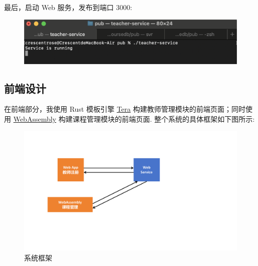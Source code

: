 \documentclass[12pt, oneside]{ctexart}
\numberwithin{figure}{section}
\numberwithin{table}{section}
\begin{document}
最后，启动 Web 服务，发布到端口 3000:
\begin{figure}[!htbp]
    \centering
    \includegraphics[width=13cm]{images/sec5/teacher-service.png}
\end{figure}

\subsection{前端设计}

在前端部分，我使用 Rust 模板引擎 \href{https://keats.github.io/tera/}{Tera} 构建教师管理模块的前端页面；同时使用 \href{https://www.rust-lang.org/what/wasm}{Web­Assembly} 构建课程管理模块的前端页面. 整个系统的具体框架如下图所示:
\begin{figure}[!htbp]
    \centering
    \includegraphics[width=13cm]{images/sec5/Framework.pdf}
    \caption{系统框架}
\end{figure}
\end{document}
